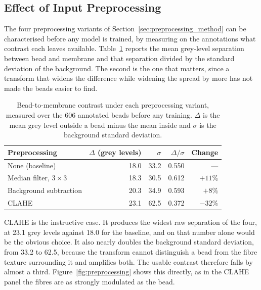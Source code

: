 \subsection{Effect of Input Preprocessing}
\label{sec:preprocessing_results}

The four preprocessing variants of Section~\ref{sec:preprocessing_method} can be
characterised before any model is trained, by measuring on the annotations what
contrast each leaves available. Table~\ref{tab:contrast} reports the mean
grey-level separation between bead and membrane and that separation divided by the
standard deviation of the background. The second is the one that matters, since a
transform that widens the difference while widening the spread by more has not made the
beads easier to find.

\begin{table}[htbp]
    \centering
    \caption{Bead-to-membrane contrast under each preprocessing variant, measured
    over the 606 annotated beads before any training. $\Delta$ is the mean grey
    level outside a bead minus the mean inside and $\sigma$ is the background
    standard deviation.}
    \label{tab:contrast}
    \begin{tabular}{lrrrr}
        \toprule
        Preprocessing & $\Delta$ (grey levels) & $\sigma$ & $\Delta/\sigma$ &
        Change \\
        \midrule
        None (baseline)        & 18.0 & 33.2 & 0.550 & ---      \\
        Median filter, $3\times3$ & 18.3 & 30.5 & 0.612 & $+11\%$ \\
        Background subtraction & 20.3 & 34.9 & 0.593 & $+8\%$  \\
        CLAHE                  & 23.1 & 62.5 & 0.372 & $-32\%$ \\
        \bottomrule
    \end{tabular}
\end{table}

CLAHE is the instructive case. It produces the widest raw separation of the four, at
23.1 grey levels against 18.0 for the baseline, and on that number alone would be
the obvious choice. It also nearly doubles the background standard deviation, from
33.2 to 62.5, because the transform cannot distinguish a bead from the fibre
texture surrounding it and amplifies both. The usable contrast therefore falls by
almost a third. Figure~\ref{fig:preprocessing} shows this directly, as in the CLAHE
panel the fibres are as strongly modulated as the bead.

